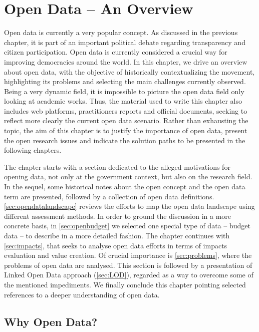 \chapter{Open Data -- An Overview}
\label{chap:opendata}

Open data is currently a very popular concept.
As discussed in the previous chapter, it is part of an important political debate regarding transparency and citizen participation. 
Open data is currently considered a crucial way for improving democracies around the world.
In this chapter, we drive an overview about open data, with the objective of historically contextualizing the movement, highlighting its problems and selecting the main challenges currently observed.
Being a very dynamic field, it is impossible to picture the open data field only looking at academic works.
Thus, the material used to write this chapter also includes web platforms, practitioners reports and official documents, seeking to reflect more clearly the current open data scenario.
Rather than exhausting the topic, the aim of this chapter is to justify the importance of open data, present the open research issues and indicate the solution paths to be presented in the following chapters.

The chapter starts with a section dedicated to the alleged motivations for opening data, not only at the government context, but also on the research field.
In the sequel, some historical notes about the open concept and the open data term are presented, followed by a collection of open data definitions.
\autoref{sec:opendatalandscape} reviews the efforts to map the open data landscape using different assessment methods.
In order to ground the discussion in a more concrete basis, in \autoref{sec:openbudget} we selected one special type of data -- budget data -- to describe in a more detailed fashion.
The chapter continues with \autoref{sec:impacts}, that seeks to analyse open data efforts in terms of impacts evaluation and value creation.
Of crucial importance is \autoref{sec:problems}, where the problems of open data are analysed.
This section is followed by a presentation of Linked Open Data approach (\autoref{sec:LOD}), regarded as a way to overcome some of the mentioned impediments.
We finally conclude this chapter pointing selected references to a deeper understanding of open data. 

\section{Why Open Data?}
\label{sec:why}

